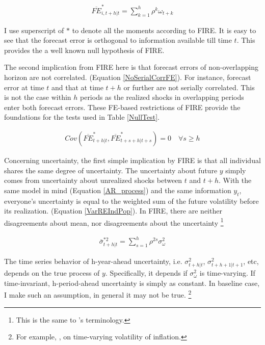 \documentclass[]{article}
\begin{document}
	\begin{eqnarray}\label{NoPastInfFE}
		\overline{FE}^{*}_{i,t+h|t} = \sum^{h}_{k=1} \rho^k \omega_{t+k}
	\end{eqnarray}
	
	I use superscript of $*$ to denote all the moments according to FIRE. It is easy to see that the forecast error is orthogonal to information available till time $t$. This provides the a well known null hypothesis of FIRE.
	
	The second implication from FIRE here is that forecast errors of non-overlapping horizon are not correlated. (Equation \ref{NoSerialCorrFE}). For instance, forecast error at time $t$ and that at time $t+h$ or further are not serially correlated. This is not the case within $h$ periods as the realized shocks in overlapping periods enter both forecast errors.  These FE-based restrictions of FIRE provide the foundations for the tests used in Table \ref{NullTest}. 
	
	\begin{eqnarray}\label{NoSerialCorrFE}
		Cov(\overline{FE}^{*}_{t+h|t}, \overline{FE}^{*}_{t+s+h|t+s}) = 0 \quad \forall s \geq h
	\end{eqnarray}
	
	Concerning uncertainty, the first simple implication by FIRE is that all individual shares the same degree of uncertainty. The uncertainty about future $y$ simply comes from uncertainty about unrealized shocks between $t$ and $t+h$. With the same model in mind (Equation \ref{AR_process}) and the same information $y_t$, everyone's uncertainty is equal to the weighted sum of the future volatility before its realization. (Equation \ref{VarREIndPop}). In FIRE, there are neither disagreements about mean, nor disagreements about the uncertainty \footnote{This is the same to \citet{jurado2015measuring}'s terminology.} 
	
	\begin{eqnarray}\label{VarREIndPop}
		\bar \sigma^{*2}_{t+h|t} = \sum^{h}_{s=1}\rho^{2s} \sigma^2_{\omega}
	\end{eqnarray}
	
	The time series behavior of h-year-ahead uncertainty, i.e. $\sigma^2_{t+h|t}$, $\sigma^2_{t+h+1|t+1}$, etc, depends on the true process of $y$. Specifically, it depends if $\sigma^2_\omega$ is time-varying. If time-invariant, h-period-ahead uncertainty is simply as constant. In baseline case, I make such an assumption, in general it may not be true. \footnote{For example, \citet{justiniano2008time}, \citet{vavra2013inflation} on time-varying volatility of inflation.} 
	
\end{document}
